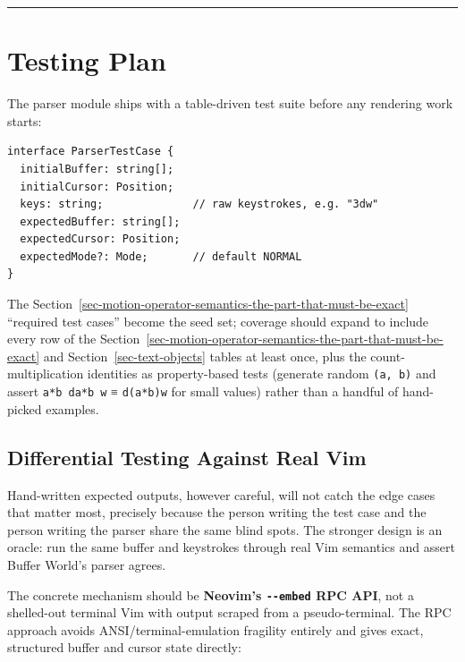 \documentclass[11pt]{article}
\begin{document}
\begin{center}\rule{0.5\linewidth}{0.5pt}\end{center}

\hypertarget{sec-testing-plan}{%
\section{Testing Plan}\label{sec-testing-plan}}

The parser module ships with a table-driven test suite before any rendering
work starts:

\begin{Verbatim}[breaklines=true, breakanywhere=true, fontsize=\small]
interface ParserTestCase {
  initialBuffer: string[];
  initialCursor: Position;
  keys: string;              // raw keystrokes, e.g. "3dw"
  expectedBuffer: string[];
  expectedCursor: Position;
  expectedMode?: Mode;       // default NORMAL
}
\end{Verbatim}

The Section~\ref{sec-motion-operator-semantics-the-part-that-must-be-exact} ``required test cases'' become the seed set; coverage should
expand to include every row of the Section~\ref{sec-motion-operator-semantics-the-part-that-must-be-exact} and Section~\ref{sec-text-objects} tables at least
once, plus the count-multiplication identities as property-based tests
(generate random \texttt{(a,\ b)} and assert \texttt{a*b\ da*b\ w} ≡ \texttt{d(a*b)w} for small
values) rather than a handful of hand-picked examples.

\hypertarget{sec-differential-testing-against-real-vim}{%
\subsection{Differential Testing Against Real Vim}\label{sec-differential-testing-against-real-vim}}

Hand-written expected outputs, however careful, will not catch the edge
cases that matter most, precisely because the person writing the test case
and the person writing the parser share the same blind spots. The stronger
design is an oracle: run the same buffer and keystrokes through real Vim
semantics and assert Buffer World's parser agrees.

The concrete mechanism should be \textbf{Neovim's \texttt{-\/-embed} RPC API}, not a
shelled-out terminal Vim with output scraped from a pseudo-terminal. The
RPC approach avoids ANSI/terminal-emulation fragility entirely and gives
exact, structured buffer and cursor state directly:
\end{document}
